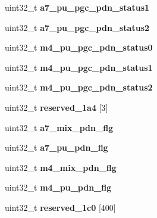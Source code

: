 \begin{DoxyCompactItemize}
\item 
\mbox{\label{structimx__gpc_a4586a6a9e2cf68a70995e4f1b1bde535}} 
uint32\+\_\+t {\bfseries a7\+\_\+pu\+\_\+pgc\+\_\+pdn\+\_\+status1}
\item 
\mbox{\label{structimx__gpc_aad100415a26c223227f4620b2aec6e3a}} 
uint32\+\_\+t {\bfseries a7\+\_\+pu\+\_\+pgc\+\_\+pdn\+\_\+status2}
\item 
\mbox{\label{structimx__gpc_a92f48d4b624a64ec6cfe9de5619cb043}} 
uint32\+\_\+t {\bfseries m4\+\_\+pu\+\_\+pgc\+\_\+pdn\+\_\+status0}
\item 
\mbox{\label{structimx__gpc_a37309c8d4850c5eedefd1543afe703aa}} 
uint32\+\_\+t {\bfseries m4\+\_\+pu\+\_\+pgc\+\_\+pdn\+\_\+status1}
\item 
\mbox{\label{structimx__gpc_a26b4076093e2083618a4a8bfd42241e4}} 
uint32\+\_\+t {\bfseries m4\+\_\+pu\+\_\+pgc\+\_\+pdn\+\_\+status2}
\item 
\mbox{\label{structimx__gpc_a424be180990b5e01c634d30f384f53b6}} 
uint32\+\_\+t {\bfseries reserved\+\_\+1a4} \mbox{[}3\mbox{]}
\item 
\mbox{\label{structimx__gpc_abaee86af9cc1c09b6f41ba39ec56a300}} 
uint32\+\_\+t {\bfseries a7\+\_\+mix\+\_\+pdn\+\_\+flg}
\item 
\mbox{\label{structimx__gpc_a5195fcbf43a315ca198b716784334f50}} 
uint32\+\_\+t {\bfseries a7\+\_\+pu\+\_\+pdn\+\_\+flg}
\item 
\mbox{\label{structimx__gpc_a12e30c6eeb31e7791f2cee711de83003}} 
uint32\+\_\+t {\bfseries m4\+\_\+mix\+\_\+pdn\+\_\+flg}
\item 
\mbox{\label{structimx__gpc_ac9aec832a217b4f0bf9d909db65b5fd1}} 
uint32\+\_\+t {\bfseries m4\+\_\+pu\+\_\+pdn\+\_\+flg}
\item 
\mbox{\label{structimx__gpc_aba539aa6814a149237aeae3e67fb00f9}} 
uint32\+\_\+t {\bfseries reserved\+\_\+1c0} \mbox{[}400\mbox{]}

\end{DoxyCompactItemize}
